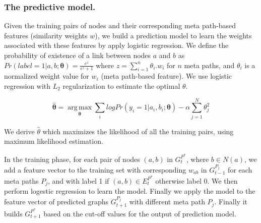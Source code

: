 




\subsubsection{The predictive model.} Given the training pairs of nodes and their corresponding meta path-based features (similarity weights $w$), we build a prediction model to learn the weights associated with these features by apply logistic regression. We define the probability of existence of a link between nodes $a$ and $b$ as 
$Pr(label = 1|a, b; \boldsymbol{\theta}) = \frac{e^{z}}{e^{z}+1}$
where $z=\sum\limits_{i=1}^{n}\theta_i.w_i$ for $n$ meta paths, and $\theta_i$ is a normalized weight value for $w_i$ (meta path-based feature). We use logistic regression with $L_2$ regularization to estimate the optimal $\theta$. 

\begin{equation*}
\boldsymbol{\hat{\theta}} = 
\operatorname*{arg\,max}_{\boldsymbol{\theta}}\sum_i log Pr(y_i = 1|a_i, b_i; \boldsymbol{\theta}) - \alpha \sum_{j=1}^N \theta_j^2
\end{equation*}

We derive \textbf{$\hat{\theta}$} which maximizes the likelihood of all the training pairs, using maximum likelihood estimation.


In the training phase, for each pair of nodes $(a,b)$ in $G^{P^*}_{t}$, where $b \in N(a)$, we add a feature vector to the training set with corresponding $w_{ab}$ in $G^{P_j}_{t-1}$ for each meta paths $P_j$, and with label 1 if $(a,b) \in E^{P^*}_{t}$ otherwise label 0. We then perform logestic regression to learn the model. Finally we apply the model to the feature vector of predicted graphs $G^{P_j}_{t+1}$ with different meta path $P_j$. Finally it builds $G^{P^*}_{t+1}$ based on the cut-off values for the output of prediction model.


